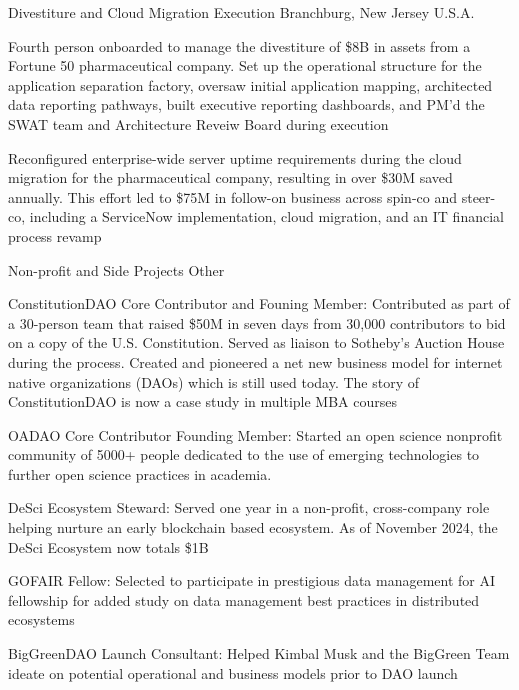 \begin{cventries}
  \cventry
    {Divestiture and Cloud Migration Execution} %
    {} %
    {} %
    {Branchburg, New Jersey U.S.A.} %
    {
      \begin{cvitems} %
        \item {Fourth person onboarded to manage the divestiture of \$8B in assets from a Fortune 50 pharmaceutical company. Set up the operational structure for the application separation factory, oversaw initial application mapping, architected data reporting pathways, built executive reporting dashboards, and PM’d the SWAT team and Architecture Reveiw Board during execution}
        \item {Reconfigured enterprise-wide server uptime requirements during the cloud migration for the pharmaceutical company, resulting in over \$30M saved annually. This effort led to \$75M in follow-on business across spin-co and steer-co, including a ServiceNow implementation, cloud migration, and an IT financial process revamp}
      \end{cvitems}
    }

  \cventry
    {Non-profit and Side Projects} %
    {Other} %
    {} %
    {} %
    {
      \begin{cvitems} %
        \item {ConstitutionDAO Core Contributor and Founing Member: Contributed as part of a 30-person team that raised \$50M in seven days from 30,000 contributors to bid on a copy of the U.S. Constitution. Served as liaison to Sotheby’s Auction House during the process. Created and pioneered a net new business model for internet native organizations (DAOs) which is still used today. The story of ConstitutionDAO is now a case study in multiple MBA courses}
        \item {OADAO Core Contributor Founding Member: Started an open science nonprofit community of 5000+ people dedicated to the use of emerging technologies to further open science practices in academia. }
        \item {DeSci Ecosystem Steward: Served one year in a non-profit, cross-company role helping nurture an early blockchain based ecosystem. As of November 2024, the DeSci Ecosystem now totals \$1B}
        \item {GOFAIR Fellow: Selected to participate in prestigious data management for AI fellowship for added study on data management best practices in distributed ecosystems}
        \item {BigGreenDAO Launch Consultant: Helped Kimbal Musk and the BigGreen Team ideate on potential operational and business models prior to DAO launch}
      \end{cvitems}
    }

\end{cventries}
